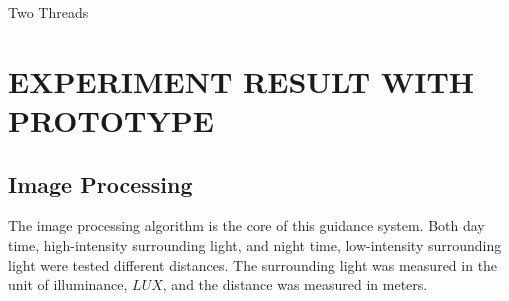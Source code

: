 \documentclass[letterpaper,12pt,oneside]{book}
\begin{document}
		\begin{algorithm}
			\caption{Two Threads}
			\begin{algorithmic} 
				\LOOP 
				\ELSE
				\ENDIF
				\ENDLOOP	
				\LOOP
				\ENDLOOP	
			\end{algorithmic}
		\end{algorithm}
		
		
		\chapter{EXPERIMENT RESULT WITH PROTOTYPE}
		
		
		
		\section{Image Processing}
		The image processing algorithm is the core of this guidance system. Both day time, high-intensity surrounding light, and night time, low-intensity surrounding light were tested different distances. The surrounding light was measured in the unit of illuminance, $LUX$, and the distance was measured in meters.%
\end{document}
